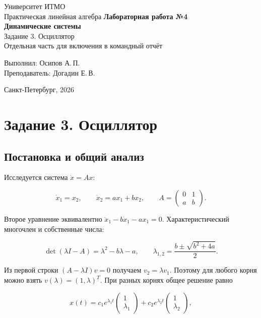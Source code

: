 \documentclass[a4paper,14pt]{extarticle}
\begin{document}
\begin{titlepage}
\centering
Университет ИТМО\\
Практическая линейная алгебра
\vfill
{\Large\bfseries Лабораторная работа №4\\[8pt] Динамические системы}\\[20pt]
{\large Задание 3. Осциллятор}\\[12pt]
Отдельная часть для включения в командный отчёт
\vfill
\begin{flushright}
Выполнил: Осипов А.\,П.\\
Преподаватель: Догадин Е.\,В.
\end{flushright}
\vfill
Санкт-Петербург, 2026
\end{titlepage}
\tableofcontents
\clearpage
\section{Задание 3. Осциллятор}

\subsection{Постановка и общий анализ}

Исследуется система $\dot x=Ax$:

\begin{equation}
\dot x_1=x_2,\qquad \dot x_2=ax_1+bx_2,\qquad
A=\begin{pmatrix}0&1\\a&b\end{pmatrix}.
\end{equation}

Второе уравнение эквивалентно $\ddot x_1-b\dot x_1-ax_1=0$. Характеристический многочлен и собственные числа:

\begin{equation}
\det(\lambda I-A)=\lambda^2-b\lambda-a,\qquad
\lambda_{1,2}=\frac{b\pm\sqrt{b^2+4a}}{2}.
\end{equation}

Из первой строки $(A-\lambda I)v=0$ получаем $v_2=\lambda v_1$. Поэтому для любого корня можно взять $v(\lambda)=(1,\lambda)^T$. При разных корнях общее решение равно

\begin{equation}
x(t)=c_1e^{\lambda_1t}\begin{pmatrix}1\\\lambda_1\end{pmatrix}
+c_2e^{\lambda_2t}\begin{pmatrix}1\\\lambda_2\end{pmatrix},
\end{equation}
\end{document}
